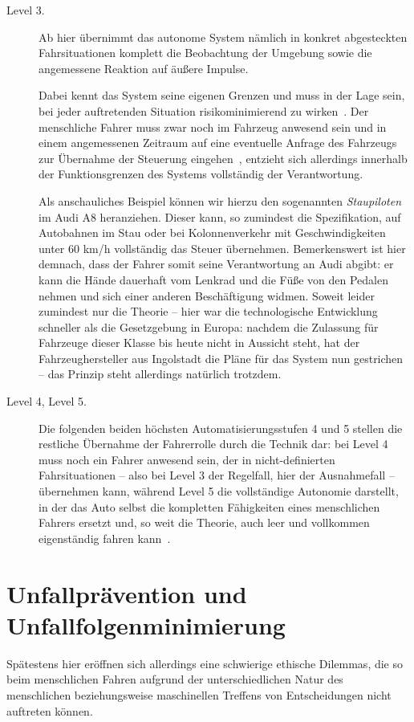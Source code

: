 \documentclass[twocolumn, german]{tum-article}
\begin{document}
\begin{description}
	\item[Level 3.] Ab hier übernimmt das autonome System nämlich in konkret abgesteckten Fahrsituationen komplett die Beobachtung der Umgebung sowie die angemessene Reaktion auf äußere Impulse.
	
	Dabei kennt das System seine eigenen Grenzen und muss in der Lage sein, bei jeder auftretenden Situation risikominimierend zu wirken~\cite[S. 1]{bast-levels}.
	Der menschliche Fahrer muss zwar noch im Fahrzeug anwesend sein und in einem angemessenen Zeitraum auf eine eventuelle Anfrage des Fahrzeugs zur Übernahme der Steuerung eingehen~\cite[S. 8]{cedr-levels}, entzieht sich allerdings innerhalb der Funktionsgrenzen des Systems vollständig der Verantwortung.
	
	Als anschauliches Beispiel können wir hierzu den sogenannten \emph{Staupiloten} im Audi A8 heranziehen.
	Dieser kann, so zumindest die Spezifikation, auf Autobahnen im Stau oder bei Kolonnenverkehr mit Geschwindigkeiten unter 60 km/h vollständig das Steuer übernehmen.
	Bemerkenswert ist hier demnach, dass der Fahrer somit seine Verantwortung an Audi abgibt: er kann die Hände dauerhaft vom Lenkrad und die Füße von den Pedalen nehmen und sich einer anderen Beschäftigung widmen.
	Soweit leider zumindest nur die Theorie -- hier war die technologische Entwicklung schneller als die Gesetzgebung in Europa: nachdem die Zulassung für Fahrzeuge dieser Klasse bis heute nicht in Aussicht steht, hat der Fahrzeughersteller aus Ingolstadt die Pläne für das System nun gestrichen~\cite{audi-no-more-staupilot} -- das Prinzip steht allerdings natürlich trotzdem.
	
	\item[Level 4, Level 5.] Die folgenden beiden höchsten Automatisierungsstufen 4 und 5 stellen die restliche Übernahme der Fahrerrolle durch die Technik dar:
	bei Level 4 muss noch ein Fahrer anwesend sein, der in nicht-definierten Fahrsituationen -- also bei Level 3 der Regelfall, hier der Ausnahmefall -- übernehmen kann, während Level 5 die vollständige Autonomie darstellt, in der das Auto selbst die kompletten Fähigkeiten eines menschlichen Fahrers ersetzt und, so weit die Theorie, auch leer und vollkommen eigenständig fahren kann~\cite[S. 8]{cedr-levels}.
\end{description}


\section{Unfallprävention und Unfallfolgenminimierung}
Spätestens hier eröffnen sich allerdings eine schwierige ethische Dilemmas, die so beim menschlichen Fahren aufgrund der unterschiedlichen Natur des menschlichen beziehungsweise maschinellen Treffens von Entscheidungen nicht auftreten können.
\end{document}
